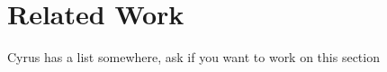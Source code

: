 \section{Related Work}\label{sec:related-work}
Cyrus has a list somewhere, ask if you want to work on this section

